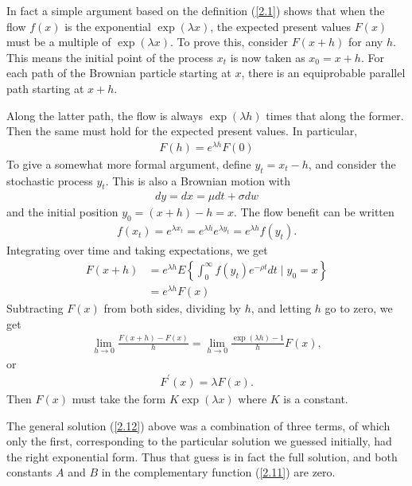 \documentclass[12pt]{article}
\theoremstyle{definition}
\begin{document}
In fact a simple argument based on the definition (\ref{2.1}) shows that when the flow $f(x)$ is the exponential $\exp (\lambda x)$, the expected present values $F(x)$ must be a multiple of $\exp (\lambda x)$. To prove this, consider $F(x+h)$ for any $h$. This means the initial point of the process $x_{t}$ is now taken as $x_{0}=x+h$. For each path of the Brownian particle starting at $x$, there is an equiprobable parallel path starting at $x+h$.

Along the latter path, the flow is always $\exp (\lambda h)$ times that along the former. Then the same must hold for the expected present values. In particular,
\begin{align*}
F(h)=e^{\lambda h} F(0)
\end{align*}
To give a somewhat more formal argument, define $y_{t}=x_{t}-h$, and consider the stochastic process $y_{t}$. This is also a Brownian motion with
\begin{align*}
d y=d x=\mu dt+\sigma dw
\end{align*}
and the initial position $y_{0}=(x+h)-h=x$. The flow benefit can be written
\begin{align*}
f\left(x_{t}\right)=e^{\lambda x_{t}}=e^{\lambda h} e^{\lambda y_{t}}=e^{\lambda h} f\left(y_{t}\right).
\end{align*}
Integrating over time and taking expectations, we get
\begin{align*}
F(x+h) & =e^{\lambda h} E\left\{\int_{0}^{\infty} f\left(y_{t}\right) e^{-\rho t} d t \mid y_{0}=x\right\} \\
& =e^{\lambda h} F(x)
\end{align*}
Subtracting $F(x)$ from both sides, dividing by $h$, and letting $h$ go to zero, we get
\begin{align*}
\lim _{h \rightarrow 0} \frac{F(x+h)-F(x)}{h}=\lim _{h \rightarrow 0} \frac{\exp (\lambda h)-1}{h} F(x),
\end{align*}
or
\begin{align*}
F^{\prime}(x)=\lambda F(x).
\end{align*}
Then $F(x)$ must take the form $K \exp (\lambda x)$ where $K$ is a constant.

The general solution (\ref{2.12}) above was a combination of three terms, of which only the first, corresponding to the particular solution we guessed initially, had the right exponential form. Thus that guess is in fact the full solution, and both constants $A$ and $B$ in the complementary function (\ref{2.11}) are zero.
\end{document}
